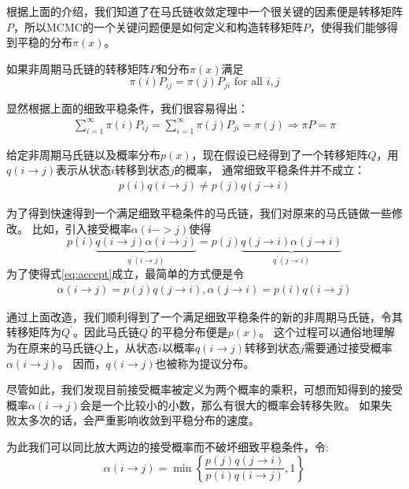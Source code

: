 根据上面的介绍，我们知道了在马氏链收敛定理中一个很关键的因素便是转移矩阵$P$，所以MCMC的一个关键问题便是如何定义和构造转移矩阵$P$，使得我们能够得到平稳的分布$\pi(x)$。

\begin{theorem}[细致平稳条件]
如果非周期马氏链的转移矩阵$P$和分布$\pi(x)$满足
\begin{equation}
\pi(i) P_{ij} = \pi(j) P_{ji}\mbox{  for all }i,j
\end{equation}
\end{theorem}

显然根据上面的细致平稳条件，我们很容易得出：
\begin{align*}
\sum_{i=1}^{\infty}{\pi(i) P_{ij}} = \sum_{i=1}^{\infty}{\pi(j) P_{ji}}= \pi(j) \Rightarrow \pi P = \pi
\end{align*}

给定非周期马氏链以及概率分布$p(x)$，现在假设已经得到了一个转移矩阵$Q$，用$q(i \rightarrow j)$表示从状态$i$转移到状态$j$的概率，
通常细致平稳条件并不成立：
\begin{align*}
p(i)q(i\rightarrow j) \neq p(j) q(j \rightarrow i)
\end{align*}

为了得到快速得到一个满足细致平稳条件的马氏链，我们对原来的马氏链做一些修改。
比如，引入接受概率$\alpha(i -> j)$使得
\begin{equation}
\label{eq:accept}
p(i) \underbrace{q(i \rightarrow j) \alpha(i \rightarrow j)}_{q^{\prime}(i \rightarrow j)}= p(j) \underbrace{q( j \rightarrow i ) \alpha(j \rightarrow i)}_{q^{\prime}(j \rightarrow i)}
\end{equation}
为了使得式\ref{eq:accept}成立，最简单的方式便是令
\begin{align*}
\alpha(i \rightarrow j ) = p(j)q(j \rightarrow i), \alpha(j \rightarrow i) = p(i) q(i \rightarrow j)
\end{align*}

通过上面改造，我们顺利得到了一个满足细致平稳条件的新的非周期马氏链，令其转移矩阵为$Q^{\prime}$。因此马氏链$Q^{\prime}$的平稳分布便是$p(x)$。
这个过程可以通俗地理解为在原来的马氏链$Q$上，从状态$i$以概率$q(i \rightarrow j)$转移到状态$j$需要通过接受概率$\alpha(i \rightarrow j)$。
因而，$q(i \rightarrow j)$也被称为提议分布。

尽管如此，我们发现目前接受概率被定义为两个概率的乘积，可想而知得到的接受概率$\alpha(i \rightarrow j)$会是一个比较小的小数，那么有很大的概率会转移失败。
如果失败太多次的话，会严重影响收敛到平稳分布的速度。

为此我们可以同比放大两边的接受概率而不破坏细致平稳条件，令:
\begin{equation}
\alpha(i \rightarrow j) = \min\left\{ \dfrac{p(j)q(j \rightarrow i)}{p(i)q(i \rightarrow j)},1 \right\}
\end{equation}

